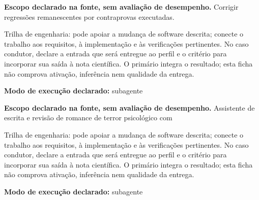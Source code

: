 
\begin{descricao}
\textbf{Escopo declarado na fonte, sem avaliação de desempenho.}
Corrigir regressões remanescentes por contraprovas executadas.
\end{descricao}

\begin{funcao}
Trilha de engenharia: pode apoiar a mudança de software descrita; conecte o trabalho aos requisitos, à implementação e às verificações pertinentes. No caso condutor, declare a entrada que será entregue ao perfil e o critério para incorporar sua saída à nota científica. O primário integra o resultado; esta ficha não comprova ativação, inferência nem qualidade da entrega.
\end{funcao}

\begin{arquitetura}
\textbf{Modo de execução declarado:} subagente
\end{arquitetura}


\begin{descricao}
\textbf{Escopo declarado na fonte, sem avaliação de desempenho.}
Assistente de escrita e revisão de romance de terror psicológico com
\end{descricao}

\begin{funcao}
Trilha de engenharia: pode apoiar a mudança de software descrita; conecte o trabalho aos requisitos, à implementação e às verificações pertinentes. No caso condutor, declare a entrada que será entregue ao perfil e o critério para incorporar sua saída à nota científica. O primário integra o resultado; esta ficha não comprova ativação, inferência nem qualidade da entrega.
\end{funcao}

\begin{arquitetura}
\textbf{Modo de execução declarado:} subagente
\end{arquitetura}


